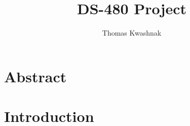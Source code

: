 \documentclass[12pt]{article}
\author{Thomas Kwashnak}
\title{DS-480 Project}
\begin{document}
\maketitle

\newpage

\tableofcontents

\newpage

\section{Abstract}

\section{Introduction}

%
%
\end{document}
